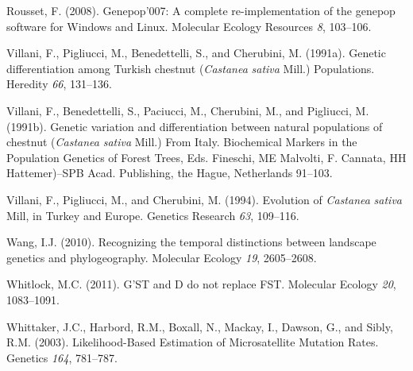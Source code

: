 \documentclass[12pt,a4paper,]{report}
\begin{document}
\leavevmode\hypertarget{ref-Rousset2008}{}%
Rousset, F. (2008). Genepop'007: A complete re-implementation of the
genepop software for Windows and Linux. Molecular Ecology Resources
\emph{8}, 103--106.

\leavevmode\hypertarget{ref-Villani1991}{}%
Villani, F., Pigliucci, M., Benedettelli, S., and Cherubini, M. (1991a).
Genetic differentiation among Turkish chestnut (\emph{Castanea}
\emph{sativa} Mill.) Populations. Heredity \emph{66}, 131--136.

\leavevmode\hypertarget{ref-villani1991genetic}{}%
Villani, F., Benedettelli, S., Paciucci, M., Cherubini, M., and
Pigliucci, M. (1991b). Genetic variation and differentiation between
natural populations of chestnut (\emph{Castanea} \emph{sativa} Mill.)
From Italy. Biochemical Markers in the Population Genetics of Forest
Trees, Eds. Fineschi, ME Malvolti, F. Cannata, HH Hattemer)--SPB Acad.
Publishing, the Hague, Netherlands 91--103.

\leavevmode\hypertarget{ref-villani1994evolution}{}%
Villani, F., Pigliucci, M., and Cherubini, M. (1994). Evolution of
\emph{Castanea} \emph{sativa} Mill, in Turkey and Europe. Genetics
Research \emph{63}, 109--116.

\leavevmode\hypertarget{ref-Wang2010a}{}%
Wang, I.J. (2010). Recognizing the temporal distinctions between
landscape genetics and phylogeography. Molecular Ecology \emph{19},
2605--2608.

\leavevmode\hypertarget{ref-whitlock_gst_2011}{}%
Whitlock, M.C. (2011). G'ST and D do not replace FST. Molecular Ecology
\emph{20}, 1083--1091.

\leavevmode\hypertarget{ref-whittaker_likelihood-based_2003}{}%
Whittaker, J.C., Harbord, R.M., Boxall, N., Mackay, I., Dawson, G., and
Sibly, R.M. (2003). Likelihood-Based Estimation of Microsatellite
Mutation Rates. Genetics \emph{164}, 781--787.
\end{document}
